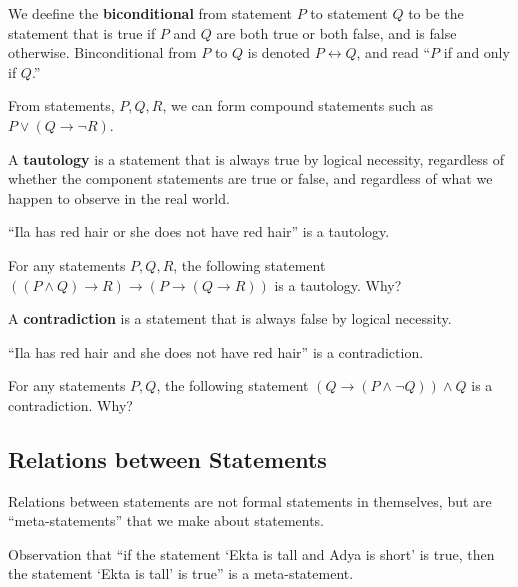 \documentclass[]{article}
\begin{document}
\begin{defn}[Biconditional] We deefine the \textbf{biconditional} from statement $P$ to statement $Q$ to be the statement that is true if $P$ and $Q$ are both true or both false, and is false otherwise. Binconditional from $P$ to $Q$ is denoted $P \leftrightarrow Q$, and read ``$P$ if and only if $Q$.'' 
\end{defn}
\begin{exmp} From statements, $P,Q,R$, we can form compound statements such as $P \vee (Q\rightarrow \neg R)$.
\end{exmp}		
\begin{defn}[Tautology] A \textbf{tautology} is a statement that is always true by logical necessity, regardless of whether the component statements are true or false, and regardless of what we happen to observe in the real world. 
\end{defn}	
\begin{exmp} ``Ila has red hair or she does not have red hair'' is a tautology.
\end{exmp}
\begin{exmp} For any statements $P,Q,R$, the following statement $((P \wedge Q)\rightarrow R) \rightarrow (P \rightarrow (Q \rightarrow R))$ is a tautology. Why?
\end{exmp}
\begin{defn}[Contradiction] A \textbf{contradiction} is a statement that is always false by logical necessity.  
\end{defn}
\begin{exmp} ``Ila has red hair and she does not have red hair'' is a contradiction.
\end{exmp}
\begin{exmp} For any statements $P,Q$, the following statement $(Q\rightarrow (P \wedge \neg Q))\wedge Q$ is a contradiction. Why?
\end{exmp}

\subsection{Relations between Statements}
Relations between statements are not formal statements in themselves, but are ``meta-statements'' that we make about statements. 
\begin{exmp} Observation that ``if the statement ‘Ekta is tall and Adya is short’ is true, then the statement ‘Ekta is tall’ is true'' is a meta-statement.
\end{exmp}
\end{document}
